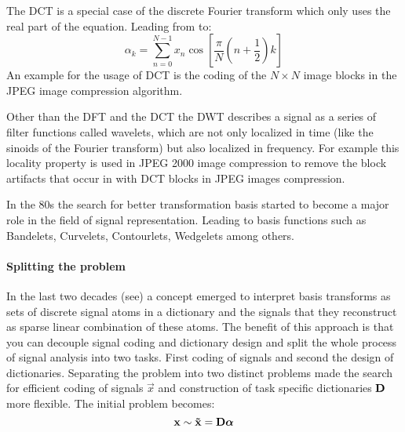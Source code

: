 The DCT is a special case of the discrete Fourier transform which only uses the
real part of the equation. Leading from  to:
\begin{equation*}
\alpha_k = \sum_{n=0}^{N-1}x_n\cos \left[ \frac{\pi}{N} \left(
n+\frac{1}{2}\right) k\right]
\end{equation*}
An example for the usage of DCT is the coding of the $N\times N$ image blocks in
the JPEG image compression algorithm.

Other than the DFT and the DCT the DWT describes a signal as a series of
filter functions called wavelets, which are not only localized in time (like the
sinoids of the Fourier transform) but also localized in frequency. 
For example this locality property is used in JPEG 2000 image compression to
remove the block artifacts that occur in with DCT blocks in JPEG images
compression. 

In the 80s the search for better transformation basis started to become a major
role in the field of signal representation. Leading to basis functions such as
Bandelets, Curvelets, Contourlets, Wedgelets among others.

\paragraph{Splitting the problem}
\cite{Rubinstein2010}
In the last two decades (see\cite{Olshausen1996,Mallat1993}) a concept emerged
to interpret basis transforms as sets of discrete signal atoms in a dictionary
and the signals that they reconstruct as sparse linear combination of these
atoms. The benefit of this approach is that you can decouple signal coding and
dictionary design and split the whole process of signal analysis into two tasks.
First coding of signals and second the design of dictionaries. Separating the
problem into two distinct problems made the search for efficient coding of
signals $\vec{x}$ and construction of task specific dictionaries $\boldsymbol{\mathrm{D}}$ more
flexible. The initial problem becomes:
\begin{equation}
 \boldsymbol{\mathrm{x}} \sim \boldsymbol{\mathrm{\tilde{x}}}  = \boldsymbol{\mathrm{D}}\boldsymbol{\mathrm{\alpha}}\label{eq:dft}
\end{equation}

